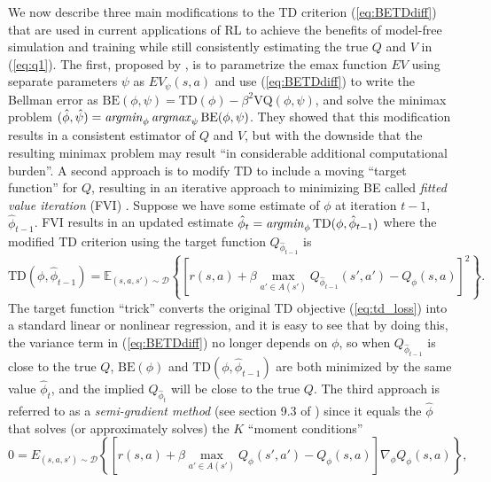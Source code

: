 We now describe three main  modifications to the TD criterion (\ref{eq:BETDdiff}) that are used in current applications
of RL to achieve the benefits of model-free
simulation and training while still consistently estimating  the true $Q$ and $V$ in  (\ref{eq:q1}).
The first,  proposed by \citet{munos:2008}, is to parametrize the emax function $EV$ using separate parameters $\psi$
as  $EV_\psi(s,a)$ and use (\ref{eq:BETDdiff}) to write the Bellman error as $\mbox{BE}(\phi,\psi)=\mbox{TD}(\phi)-\beta^2 \mbox{VQ}(\phi,\psi)$,
and solve the minimax problem 
$(\hat\phi,\hat\psi)=\mathop{\it argmin}_\phi\mathop{\it argmax}_\psi \mbox{BE}(\phi,\psi)$. They showed that 
this modification results in a consistent estimator of $Q$ and $V$, but with the downside that the resulting minimax problem may result
``in considerable additional computational burden''. 
A second approach is to modify $\mbox{TD}$ to include
a moving  ``target function'' for $Q$, resulting in an iterative approach to minimizing BE called
{\it fitted value iteration\/} (FVI) \citet{antos:2008}.  Suppose we have some estimate of $\phi$  at
iteration $t-1$, $\hat\phi_{t-1}$. FVI results in an updated estimate $\hat\phi_t=\mathop{\it argmin}_\phi\mbox{TD}(\phi,\hat\phi_{t-1})$
where the modified TD criterion using the target function $Q_{\hat\phi_{t-1}}$ is 
\begin{equation}
 \mbox{TD}(\phi,\hat\phi_{t-1}) = \mathbb{E}_{(s,a,s')\sim\mathcal{D}} \left\{ \left[r(s,a) +
 \beta \max_{a' \in A(s')} Q_{\hat\phi_{t-1}}(s', a') - Q_\phi(s, a) \right]^2 \right\}.
\label{eq:dqn_target}
\end{equation}
The target function ``trick'' converts the original TD objective (\ref{eq:td_loss}) into a standard linear or nonlinear regression, 
and it is easy to see that by doing this, the variance term in (\ref{eq:BETDdiff}) no longer depends on $\phi$, so when 
$Q_{\hat\phi_{t-1}}$ is close to the true $Q$, $\mbox{BE}(\phi)$ and $\mbox{TD}(\phi,\hat\phi_{t-1})$ are both minimized
by the same value $\hat\phi_t$, and the implied $Q_{\hat\phi_t}$ will be close to the true $Q$. 
The third approach is referred to as a {\it semi-gradient method\/} (see section 9.3 of
\citet{BartoSutton:2020}) since it equals the $\hat\phi$ that solves 
(or approximately solves) the $K$ ``moment conditions''
\begin{equation}
           0 = E_{(s,a,s') \sim \mathcal{D}} \left\{ \left[r(s,a)+\beta  \max_{a' \in A(s')} Q_{\phi}(s', a')
 -Q_\phi(s,a)\right]\nabla_\phi Q_\phi(s,a)
\right\},
\label{eq:semigradient_objective}
\end{equation}
